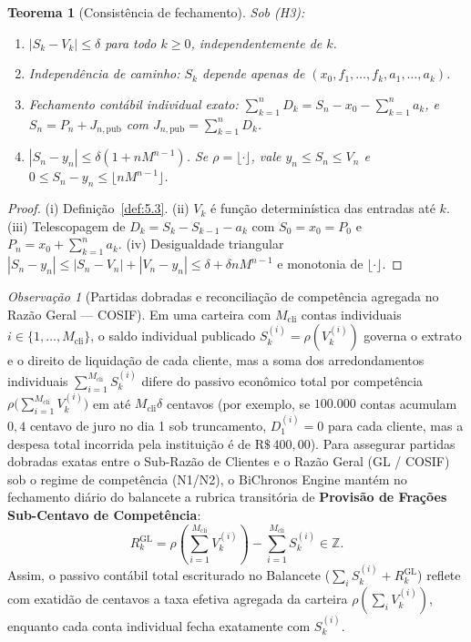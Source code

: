 \documentclass[11pt, a4paper]{article}
\theoremstyle{definition}
\theoremstyle{plain}
\newtheorem{teorema}[definicao]{Teorema}
\theoremstyle{remark}
\newtheorem{observacao}[definicao]{Observação}
\begin{document}
\begin{teorema}[Consistência de fechamento]\label{teo:5.8}
Sob (H3):
\begin{enumerate}[label=(\roman*)]
    \item $|S_k - V_k| \le \delta$ para todo $k \ge 0$, independentemente de $k$.
    \item Independência de caminho: $S_k$ depende apenas de $(x_0, f_1, \dots, f_k, a_1, \dots, a_k)$.
    \item Fechamento contábil individual exato: $\sum_{k=1}^{n} D_k = S_n - x_0 - \sum_{k=1}^{n} a_k$, e $S_n = P_n + J_{n,\text{pub}}$ com $J_{n,\text{pub}} = \sum_{k=1}^n D_k$.
    \item $|S_n - y_n| \le \delta(1 + n M^{n-1})$. Se $\rho = \lfloor \cdot \rfloor$, vale $y_n \le S_n \le V_n$ e $0 \le S_n - y_n \le \lfloor n M^{n-1} \rfloor$.
\end{enumerate}
\end{teorema}
\begin{proof}
(i) Definição~\ref{def:5.3}. (ii) $V_k$ é função determinística das entradas até $k$. (iii) Telescopagem de $D_k = S_k - S_{k-1} - a_k$ com $S_0 = x_0 = P_0$ e $P_n = x_0 + \sum_{k=1}^n a_k$. (iv) Desigualdade triangular $|S_n - y_n| \le |S_n - V_n| + |V_n - y_n| \le \delta + \delta n M^{n-1}$ e monotonia de $\lfloor \cdot \rfloor$.
\end{proof}

\begin{observacao}[Partidas dobradas e reconciliação de competência agregada no Razão Geral --- COSIF]\label{obs:5.8b}
Em uma carteira com $M_{\text{cli}}$ contas individuais $i \in \{1, \dots, M_{\text{cli}}\}$, o saldo individual publicado $S_k^{(i)} = \rho(V_k^{(i)})$ governa o extrato e o direito de liquidação de cada cliente, mas a soma dos arredondamentos individuais $\sum_{i=1}^{M_{\text{cli}}} S_k^{(i)}$ difere do passivo econômico total por competência $\rho\big(\sum_{i=1}^{M_{\text{cli}}} V_k^{(i)}\big)$ em até $M_{\text{cli}}\delta$ centavos (por exemplo, se $100.000$ contas acumulam $0{,}4$ centavo de juro no dia 1 sob truncamento, $D_1^{(i)} = 0$ para cada cliente, mas a despesa total incorrida pela instituição é de $\text{R\$}\,400{,}00$). Para assegurar partidas dobradas exatas entre o Sub-Razão de Clientes e o Razão Geral (GL / COSIF) sob o regime de competência (N1/N2), o BiChronos Engine mantém no fechamento diário do balancete a rubrica transitória de \textbf{Provisão de Frações Sub-Centavo de Competência}:
\[
R_k^{\text{GL}} = \rho\left(\sum_{i=1}^{M_{\text{cli}}} V_k^{(i)}\right) - \sum_{i=1}^{M_{\text{cli}}} S_k^{(i)} \in \mathbb{Z}.
\]
Assim, o passivo contábil total escriturado no Balancete ($\sum_i S_k^{(i)} + R_k^{\text{GL}}$) reflete com exatidão de centavos a taxa efetiva agregada da carteira $\rho(\sum_i V_k^{(i)})$, enquanto cada conta individual fecha exatamente com $S_k^{(i)}$.
\end{observacao}
\end{document}
